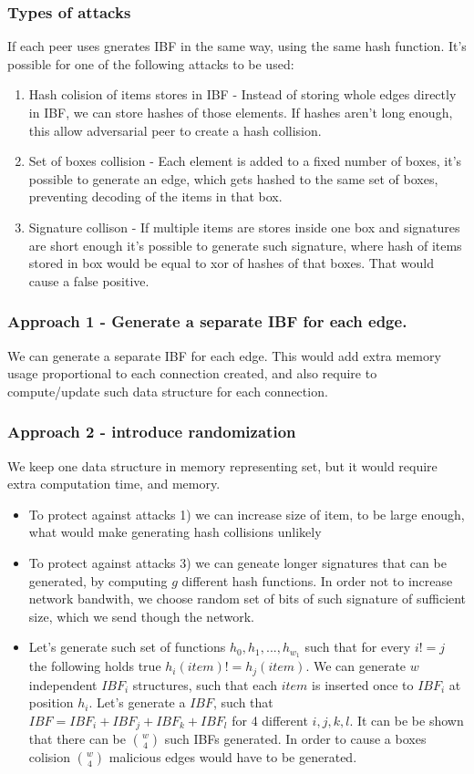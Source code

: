 \documentclass[11pt]{article}
\begin{document}
\subsubsection{Types of attacks}
If each peer uses gnerates IBF in the same way, using the same hash function.
It's possible for one of the following attacks to be used:
\begin{enumerate}
\item Hash colision of items stores in IBF -  Instead of storing whole edges directly in IBF, we can store hashes of those elements.
If hashes aren't long enough, this allow adversarial peer to create a hash collision.
\item Set of boxes collision - Each element is added to a fixed number of boxes, it's possible to generate an edge, which gets hashed to the same set of boxes, preventing decoding of the items in that box.
\item Signature collison - If multiple items are stores inside one box and signatures are short enough it's possible to generate such signature, where hash of items stored in box would be equal to xor of hashes of that boxes. That would cause a false positive.
\end{enumerate}
\subsubsection{Approach 1 - Generate a separate IBF for each edge.}
We can generate a separate IBF for each edge.
This would add extra memory usage proportional to each connection created, and also require to compute/update such data structure for each connection.
\subsubsection{Approach 2 - introduce randomization}
We keep one data structure in memory representing set, but it would require extra computation time, and memory.
\begin{itemize}
\item To protect against attacks 1) we can increase size of item, to be large enough, what would make generating hash collisions unlikely
\item To protect against attacks 3) we can geneate longer signatures that can be generated, by computing $g$ different hash functions.
In order not to increase network bandwith, we choose random set of bits of such signature of sufficient size, which we send though the network.
\item Let's generate such set of functions $h_0, h_1, ..., h_{w_1}$ such that for every $i != j$ the following holds true $h_i(item) != h_j(item)$.
We can generate $w$ independent $IBF_i$ structures, such that each $item$ is inserted once to $IBF_i$ at position $h_i$.
Let's generate a  $IBF$, such that $IBF = IBF_i + IBF_j + IBF_k + IBF_l$ for 4 different $i,j,k,l$.
It can be be shown that there can be $\binom{w}{4}$ such IBFs generated. In order to cause a boxes colision $\binom{w}{4}$ malicious edges would have to be generated.

\end{itemize}
\end{document}
